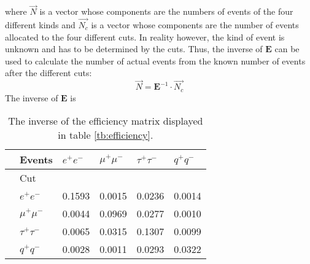 where $\vec{N}$ is a vector whose components are the numbers of events of the four different kinds and $\vec{N_c}$ is a vector whose components are the number of events allocated to the four different cuts. 
In reality however, the kind of event is unknown and has to be determined by the cuts. Thus, the inverse of $\boldsymbol{E}$ can be used to calculate the number of actual events from the known number of events after the different cuts:
\begin{equation}
\vec{N}=\boldsymbol{E}^{-1}\cdot\vec{N_c}
\end{equation} 
The inverse of $\boldsymbol{E}$ is
\begin{table}[H]\centering
	\begin{tabular}{@{}llllll@{}}
		\toprule
		&Events &$e^+e^-$&$\mu^+\mu^-$&$\tau^+\tau^-$&$q^+q^-$\\
		\midrule
		&Cut&&&&\\
		&$e^+e^-$&0.1593&0.0015&0.0236&0.0014\\
		&$\mu^+\mu^-$&0.0044&0.0969&0.0277&0.0010\\
		&$\tau^+\tau^-$&0.0065&0.0315&0.1307&0.0099\\
		&$q^+q^-$&0.0028&0.0011&0.0293&0.0322\\
		\bottomrule
	\end{tabular}
	\caption[Inverse efficiency matrix]{The inverse of the efficiency matrix displayed in table \ref{tb:efficiency}.}
\end{table}
